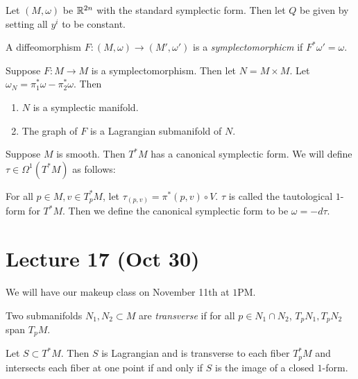 \documentclass[twoside, 10pt]{article}
\begin{document}
    \begin{exm}
        Let $(M,\omega)$ be $\mathbb{R}^{2n}$ with the standard symplectic form. Then let $Q$ be given by setting all $y^i$ to be constant.
    \end{exm}

    \begin{defn}
        A diffeomorphism $F:(M,\omega) \to (M', \omega')$ is a \textit{symplectomorphicm} if $F^*\omega' = \omega$.
    \end{defn}

    \begin{exer}[Homework]
        Suppose $F:M \to M$ is a symplectomorphism. Then let $N = M \times M$. Let $\omega_N = \pi_1^* \omega - \pi_2^* \omega$. Then
        \begin{enumerate}
            \item $N$ is a symplectic manifold.
            \item The graph of $F$ is a Lagrangian submanifold of $N$.
        \end{enumerate}
    \end{exer}

    \begin{exm}
        Suppose $M$ is smooth. Then $T^*M$ has a canonical symplectic form. We will define $\tau \in \Omega^1(T^*M)$ as follows:

        For all $p \in M, v\in T^*_p M$, let $\tau_{(p,v)} = \pi^*(p,v) \circ V$. $\tau$ is called the tautological $1$-form for $T^*M$. Then we define the canonical symplectic form to be $\omega = -d\tau$.
    \end{exm}

    \section{Lecture 17 (Oct 30)}%
    \label{sec:lecture_17_oct_30_}
    
    We will have our makeup class on November 11th at $1$PM.

    \begin{defn}
        Two submanifolds $N_1,N_2 \subset M$ are \textit{transverse} if for all $p \in N_1 \cap N_2$, $T_pN_1, T_pN_2$ span $T_pM$.
    \end{defn}

    \begin{exer}[Homework]
        Let $S \subset T^*M$. Then $S$ is Lagrangian and is transverse to each fiber $T_p^*M$ and intersects each fiber at one point if and only if $S$ is the image of a closed $1$-form.
    \end{exer}
\end{document}

